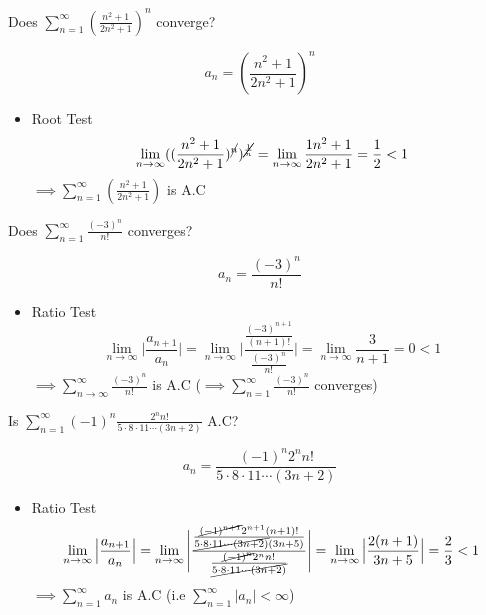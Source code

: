 \begin{eg}
Does \(\displaystyle \sum^{\infty}_{n = 1} (\frac{n^2 + 1}{2n^2 + 1})^n\) converge?

\soln
\[\displaystyle a_n = (\frac{n^2 + 1}{2n^2 + 1})^n\]
\begin{itemize}
\item Root Test
\[\displaystyle \lim_{n \to \infty} ((\frac{n^2 + 1}{2n^2 + 1})^{\cancel{n}})^{\cancel{\frac{1}{n}}} = \lim_{n \to \infty} \frac{1n^2 + 1}{2n^2 + 1} = \frac{1}{2} < 1\]
\(\displaystyle \implies \sum^{\infty}_{n = 1} (\frac{n^2 + 1}{2n^2 + 1})\) is A.C
\end{itemize}
\end{eg}
\begin{eg} 
Does \(\displaystyle \sum^{\infty}_{n = 1} \frac{(-3)^n}{n!}\) converges?

\soln
\[\displaystyle a_n = \frac{(-3)^n}{n!}\]
\begin{itemize}
\item Ratio Test
\[\displaystyle \lim_{n \to \infty} \Big| \frac{a_{n +1}}{a_n} \Big| = \lim_{n \to \infty} \Bigg| \frac{\frac{(-3)^{n + 1}}{(n+1)!}}{\frac{(-3)^n}{n!}} \Bigg| = \lim_{n \to \infty} \frac{3}{n + 1} = 0 < 1\]
\(\displaystyle \implies \sum^{\infty}_{n \to \infty} \frac{(-3)^n}{n!}\) is A.C (\(\displaystyle \implies \sum^{\infty}_{n = 1} \frac{(-3)^n}{n!}\) converges)
\end{itemize}
\end{eg}
\begin{eg}
Is \(\displaystyle \sum^{\infty}_{n = 1} (-1)^n \frac{2^n n!}{5 \cdot 8 \cdot 11 \cdots (3n + 2)}\) A.C?

\soln
\[\displaystyle a_n = \frac{(-1)^n 2^n n!}{5 \cdot 8 \cdot 11 \cdots (3n + 2)}\]
\begin{itemize}
\item Ratio Test
\[\displaystyle \lim_{n \to \infty} \Big| \frac{a_{n + 1}}{a_n} \Big| = \lim_{n \to \infty} \Bigg|\frac{\frac{\cancel{(-1)^{n + 1}} 2^{n + 1} (n + 1)!}{\cancel{5 \cdot 8 \cdot 11 \cdots (3n +2)}(3n + 5)}}{\frac{\cancel{(-1)^n} 2^n n!}{\cancel{5 \cdot 8 \cdot 11 \cdots (3n + 2)}}} \Bigg| = \lim_{n \to \infty} \Big| \frac{2(n +1)}{3n + 5} \Big| = \frac{2}{3} < 1\]
\(\displaystyle \implies \sum^{\infty}_{n = 1} a_n\) is A.C \quad (i.e \(\displaystyle \sum^{\infty}_{n = 1} \Big| a_n \Big| < \infty\))
\end{itemize}
\end{eg}
